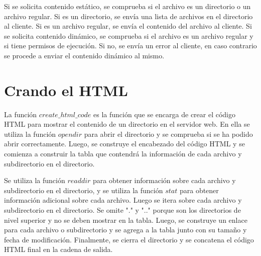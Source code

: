 \documentclass{article}
\begin{document}
		
		Si se solicita contenido estático, se comprueba si el archivo es un directorio o un archivo regular. Si es un directorio, se envía una lista de archivos en el directorio al cliente. Si es un archivo regular, se envía el contenido del archivo al cliente. Si se solicita contenido dinámico, se comprueba si el archivo es un archivo regular y si tiene permisos de ejecución. Si no, se envía un error al cliente, en caso contrario se procede a enviar el contenido dinámico al mismo. 
		
	\section{Crando el HTML}
	
		La función $create\_html\_code$ es la función que se encarga de crear el código HTML para mostrar el contenido de un directorio en el servidor web. En ella se utiliza la función $opendir$ para abrir el directorio y se comprueba si se ha podido abrir correctamente. Luego, se construye el encabezado del código HTML y se comienza a construir la tabla que contendrá la información de cada archivo y subdirectorio en el directorio. 
		
		Se utiliza la función $readdir$ para obtener información sobre cada archivo y subdirectorio en el directorio, y se utiliza la función $stat$ para obtener información adicional sobre cada archivo. Luego se itera sobre cada archivo y subdirectorio en el directorio. Se omite "." y ".." porque son los directorios de nivel superior y no se deben mostrar en la tabla. 
		Luego, se construye un enlace para cada archivo o subdirectorio y se agrega a la tabla junto con su tamaño y fecha de modificación. Finalmente, se cierra el directorio y se concatena el código HTML final en la cadena de salida. 
		
\end{document}
